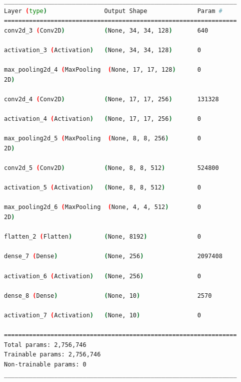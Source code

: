 \begin{lstlisting}[language=Bash,caption={Overview of layers in Custom 2D Convolutional network built into the Custom LSTM Network in \cref{lst:custom_conv_lstm_layers}.},label={lst:custom_conv_2d_layers},numbers=none,float=htb]
_________________________________________________________________
Layer (type)                Output Shape              Param #   
=================================================================
conv2d_3 (Conv2D)           (None, 34, 34, 128)       640       
                                                                
activation_3 (Activation)   (None, 34, 34, 128)       0         
                                                                
max_pooling2d_4 (MaxPooling  (None, 17, 17, 128)      0         
2D)                                                             
                                                                
conv2d_4 (Conv2D)           (None, 17, 17, 256)       131328    
                                                                
activation_4 (Activation)   (None, 17, 17, 256)       0         
                                                                
max_pooling2d_5 (MaxPooling  (None, 8, 8, 256)        0         
2D)                                                             
                                                                
conv2d_5 (Conv2D)           (None, 8, 8, 512)         524800    
                                                                
activation_5 (Activation)   (None, 8, 8, 512)         0         
                                                                
max_pooling2d_6 (MaxPooling  (None, 4, 4, 512)        0         
2D)                                                             
                                                                
flatten_2 (Flatten)         (None, 8192)              0         
                                                                
dense_7 (Dense)             (None, 256)               2097408   
                                                                
activation_6 (Activation)   (None, 256)               0         
                                                                
dense_8 (Dense)             (None, 10)                2570      
                                                                
activation_7 (Activation)   (None, 10)                0         
                                                                
=================================================================
Total params: 2,756,746
Trainable params: 2,756,746
Non-trainable params: 0
_________________________________________________________________
\end{lstlisting}

